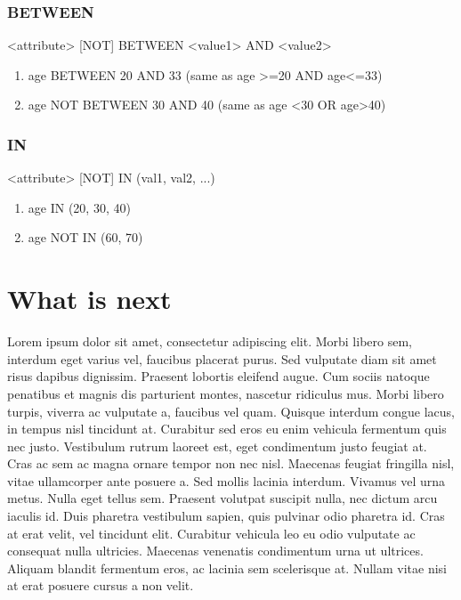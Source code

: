 \subsubsection{BETWEEN}
<attribute> [NOT] BETWEEN <value1> AND <value2>

\begin{enumerate}
\item age BETWEEN 20 AND 33 (same as age >=20 AND age<=33)
\item age NOT BETWEEN 30 AND 40 (same as age <30 OR age>40)
\end{enumerate}


\subsubsection{IN}
<attribute> [NOT] IN (val1, val2, ...)
\begin{enumerate}
\item age IN (20, 30, 40)
\item age NOT IN (60, 70)
\end{enumerate}

\section{What is next}
Lorem ipsum dolor sit amet, consectetur adipiscing elit. Morbi libero sem,
interdum eget varius vel, faucibus placerat purus. Sed vulputate diam sit amet
risus dapibus dignissim. Praesent lobortis eleifend augue. Cum sociis natoque
penatibus et magnis dis parturient montes, nascetur ridiculus mus. Morbi libero
turpis, viverra ac vulputate a, faucibus vel quam. Quisque interdum congue
lacus, in tempus nisl tincidunt at. Curabitur sed eros eu enim vehicula
fermentum quis nec justo. Vestibulum rutrum laoreet est, eget condimentum justo
feugiat at. Cras ac sem ac magna ornare tempor non nec nisl. Maecenas feugiat
fringilla nisl, vitae ullamcorper ante posuere a. Sed mollis lacinia interdum.
Vivamus vel urna metus. Nulla eget tellus sem. Praesent volutpat suscipit nulla,
nec dictum arcu iaculis id. Duis pharetra vestibulum sapien, quis pulvinar odio
pharetra id. Cras at erat velit, vel tincidunt elit. Curabitur vehicula leo eu
odio vulputate ac consequat nulla ultricies. Maecenas venenatis condimentum
urna ut ultrices. Aliquam blandit fermentum eros, ac lacinia sem scelerisque
at. Nullam vitae nisi at erat posuere cursus a non velit.
